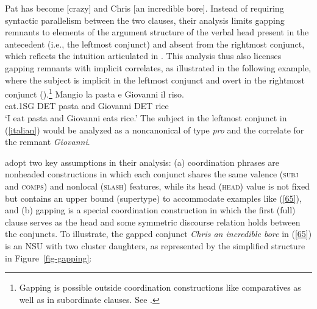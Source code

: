 \ea Pat has become [crazy] and Chris [an incredible bore]. \citep[248]{Abeille2014}  \label{65}\z
%
Instead of requiring %
syntactic parallelism between the two clauses, their analysis limits gapping remnants to elements of the argument structure of the verbal head present in the antecedent (i.e., the leftmost conjunct) and absent from the rightmost conjunct, which reflects the intuition articulated in \citet{Hankamer1971}. This analysis thus also licenses gapping remnants with implicit correlates, as illustrated in the
following  example, where the subject is implicit in the leftmost conjunct and overt in the rightmost conjunct (\citealt[251]{Abeille2014}).\footnote{Gapping is possible outside coordination
constructions like comparatives as well as in 
subordinate clauses. See .}
\ea
\label{italian}
\gll Mangio la pasta e Giovanni il riso.\\
eat.\textsc{1SG} \textsc{DET} pasta and Giovanni \textsc{DET} rice\\
\glt `I eat pasta and Giovanni eats rice.'
\z
%
The subject in the leftmost conjunct in (\ref{italian}) would be analyzed as a noncanonical  of type {\it pro} and the correlate for the remnant {\it Giovanni}. %

\citet{Abeille2014} adopt two  key assumptions in their analysis: (a) coordination phrases are nonheaded constructions in which each conjunct shares the same
valence (\textsc{subj} and \textsc{comps}) and nonlocal (\textsc{slash}) features, while
 its head (\textsc{head}) value is not fixed but contains an upper bound (supertype) to accommodate examples like (\ref{65}), and (b) gapping is a special coordination construction in which the first (full) clause serves as the head 
 and some symmetric discourse relation holds between the conjuncts. 
 To illustrate, the gapped conjunct \emph{Chris an incredible
  bore} in (\ref{65}) is an NSU  with two cluster daughters, as represented by
  the simplified structure in 
  Figure~\ref{fig-gapping}:
 
